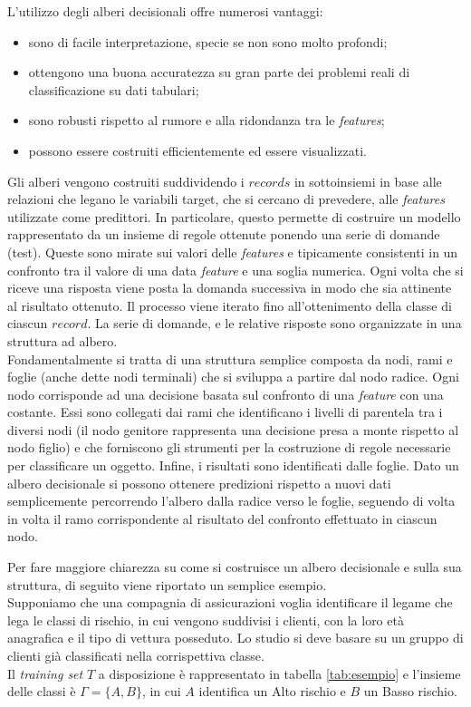 L'utilizzo degli alberi decisionali offre numerosi vantaggi:
\begin{itemize}
    \item sono di facile interpretazione, specie se non sono molto profondi;
    \item ottengono una buona accuratezza su gran parte dei problemi reali di classificazione su dati tabulari;
    \item sono robusti rispetto al rumore e alla ridondanza tra le \textit{features};
    \item possono essere costruiti efficientemente ed essere visualizzati.
\end{itemize}

Gli alberi vengono costruiti suddividendo i $records$ in sottoinsiemi in base alle relazioni che legano le variabili target, che si cercano di prevedere, alle \textit{features} utilizzate come predittori. In particolare, questo permette di costruire un modello rappresentato da un insieme di regole ottenute ponendo una serie di domande (test). Queste sono mirate sui valori delle \textit{features} e tipicamente consistenti in un confronto tra il valore di una data \textit{feature} e una soglia numerica. Ogni volta che si riceve una risposta viene posta la domanda successiva in modo che sia attinente al risultato ottenuto. Il processo viene iterato fino all'ottenimento della classe di ciascun $record$. La serie di domande, e le relative risposte sono organizzate in una struttura ad albero.\\
Fondamentalmente si tratta di una struttura semplice composta da nodi, rami e foglie (anche dette nodi terminali) che si sviluppa a partire dal nodo radice. Ogni nodo corrisponde ad una decisione basata sul confronto di una \textit{feature} con una costante. Essi sono collegati dai rami che identificano i livelli di parentela tra i diversi nodi (il nodo genitore rappresenta una decisione presa a monte rispetto al nodo figlio) e che forniscono gli strumenti per la costruzione di regole necessarie per classificare un oggetto. Infine, i risultati sono identificati dalle foglie. Dato un albero decisionale si possono ottenere predizioni rispetto a nuovi dati semplicemente percorrendo l'albero dalla radice verso le foglie, seguendo di volta in volta il ramo corrispondente al risultato del confronto effettuato in ciascun nodo.

Per fare maggiore chiarezza su come si costruisce un albero decisionale e sulla sua struttura, di seguito viene riportato un semplice esempio.\\
Supponiamo che una compagnia di assicurazioni voglia identificare il legame che lega le classi di rischio, in cui vengono suddivisi i clienti, con la loro età anagrafica e il tipo di vettura posseduto. Lo studio si deve basare su un gruppo di clienti già classificati nella corrispettiva classe.\\ 
Il \textit{training set} $T$ a disposizione è rappresentato in tabella \ref{tab:esempio} e l’insieme delle classi è $\Gamma = \{A, B\}$, in cui $A$ identifica un Alto rischio e $B$ un Basso rischio.

